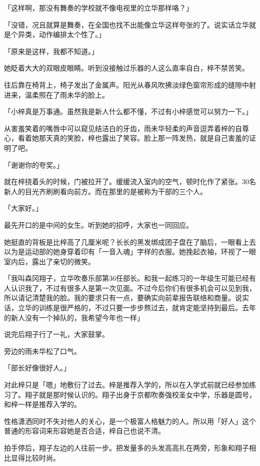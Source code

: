\documentclass[UTF8]{ctexart}
\begin{document}
    「这样啊，那没有舞奏的学校就不像电视里的立华那样咯？」

    「没错，况且就算是舞奏，在全国也找不出能像立华这样夸张的了。说实话立华就是个异类，动作编排太个性了。」

    「原来是这样，我都不知道。」

    她眨着大大的双眼皮眼睛。听到没接触过乐器的人这么直率自白，梓不禁苦笑。

    往后靠在椅背上，椅子发出了金属声。阳光从春风吹拂淡绿色窗帘形成的缝隙中射进来，温柔照在了雨未华的脸上。

    「小梓真是万事通。虽然我是新人什么都不懂，不过有小梓感觉可以努力一下。」

    从害羞笑着的嘴唇中可以窥见结洁白的牙齿，雨未华轻柔的声音逗弄着梓的自尊心，看着她那天真的笑脸，梓也露出了笑容。脸上那一阵发热，就是自己害羞的证明了吧。

    「谢谢你的夸奖。」

    就在梓挠着头的时候，门被拉开了。缓缓流入室内的空气，顿时化作了紧张。30名新人的目光齐刷刷看向前方。而在那里的是被称为干部的三个人。

    「大家好。」

    最先开口的是中间的女生。听到她的招呼，大家也一同回应。

    她挺直的背板是比梓高了几厘米呢？长长的黑发绑成团子盘在了脑后，一眼看上去以为是运动部的她身穿着印有「一音入魂」字样的衣服。她挽起衣袖，环视了一眼室内后，露出了亲切的微笑。

    「我叫森冈翔子，立华吹奏乐部第36任部长。和我一起练习的一年级生可能已经有人认识我了，不过有很多人是第一次见面。不过今后你们有很多机会可以见到我，所以请记清楚我的脸。我的要求只有一点，要确实向前辈报告联络和商量。说实话，立华的训练是很严格的，不过只要一步步熬过去，就肯定能坚持到最后。去年的新人没有一个掉队的，我希望今年也一样」

    说完后翔子行了一礼，大家鼓掌。

    旁边的雨未华松了口气。

    「部长好像很好人。」

    对此梓只是「嗯」地敷衍了过去。梓是推荐入学的，所以在入学式前就已经参加练习了。翔子就是那时候认识的。翔子出身于京都吹奏强校圣女中学，乐器是圆号，和梓一样是推荐入学的。

    性格潇洒同时不失对他人的关心，是一个极富人格魅力的人。所以用「好人」这个普通的形容词来形容她是否合适，梓自己也说不清。

    拍手停后，翔子左边的人往前一步。把发量多的头发高高扎在两旁，形象和翔子相比显得比较时尚。
\end{document}
